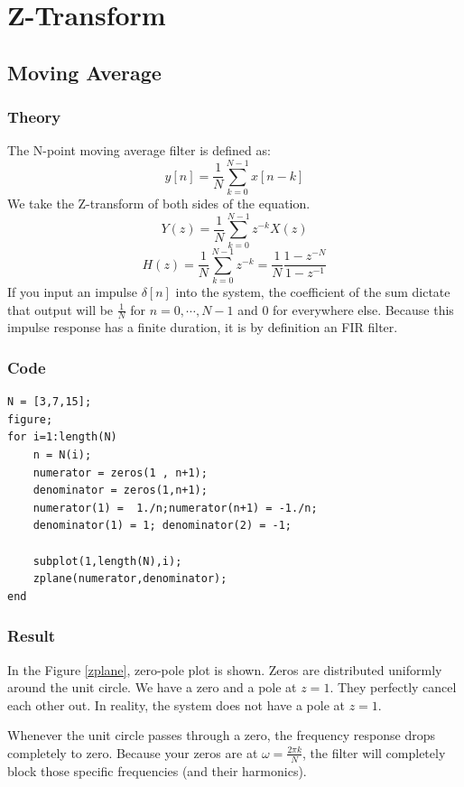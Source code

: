 \documentclass[12pt]{article}
\begin{document}
	\section{Z-Transform}
	\subsection{Moving Average}
	\subsubsection{Theory}
	The N-point moving average filter is defined as:
	\begin{equation}
		y[n] = \frac1N \sum_{k=0}^{N-1} x[n-k]
	\end{equation}
	We take the Z-transform of both sides of the equation.
	\begin{equation}
		Y(z) = \frac1N \sum_{k = 0}^{N-1} z^{-k} X(z)
	\end{equation}
	\begin{equation}
		H(z) = \frac1N \sum_{k = 0}^{N-1} z^{-k} = \frac1N \frac{1-z^{-N}}{1-z^{-1}}
	\end{equation}
	If you input an impulse $\delta[n]$ into the system, the coefficient of the sum dictate that output will be $\frac1N$ for $n = 0, \cdots, N-1$ and $0$ for everywhere else. Because this impulse response has a finite duration, it is by definition an FIR filter.
	
	\subsubsection{Code}
	\begin{lstlisting}
N = [3,7,15];
figure;
for i=1:length(N)
	n = N(i);
	numerator = zeros(1 , n+1);
	denominator = zeros(1,n+1);
	numerator(1) =  1./n;numerator(n+1) = -1./n;
	denominator(1) = 1; denominator(2) = -1;

	subplot(1,length(N),i);
	zplane(numerator,denominator);
end
	\end{lstlisting}
	\subsubsection{Result}
		In the Figure \ref{zplane}, zero-pole plot is shown. Zeros are distributed uniformly around the unit circle. We have a zero and a pole at $z=1$. They perfectly cancel each other out. In reality, the system does not have a pole at $z=1$.
		
		Whenever the unit circle passes through a zero, the frequency response drops completely to zero. Because your zeros are at $\omega = \frac{2\pi k}{N}$, the filter will completely block those specific frequencies (and their harmonics).
		
\end{document}
